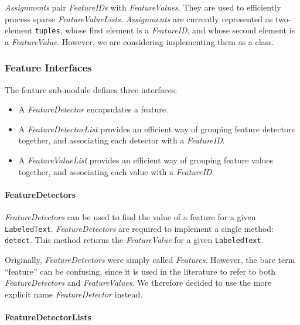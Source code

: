 \documentclass[12pt]{article}
\begin{document}
      \textit{Assignments} pair \textit{FeatureIDs} with
      \textit{FeatureValues}.  They are used to efficiently process
      sparse \textit{FeatureValueLists}.  \textit{Assignments} are
      currently represented as two-element \texttt{tuples}, whose
      first element is a \textit{FeatureID}, and whose second element
      is a \textit{FeatureValue}.  However, we are considering
      implementing them as a class.

    \subsubsection{Feature Interfaces}

      The feature sub-module defines three interfaces:

      \begin{itemize}
        \item A \textit{FeatureDetector} encapsulates a feature.

        \item A \textit{FeatureDetectorList} provides an efficient way
        of grouping feature detectors together, and associating each
        detector with a \textit{FeatureID}.

        \item A \textit{FeatureValueList} provides an efficient way of
        grouping feature values together, and associating each value
        with a \textit{FeatureID}.
      \end{itemize}

      \paragraph{FeatureDetectors}

      \textit{FeatureDetectors} can be used to find the value of a
      feature for a given \texttt{LabeledText}.
      \textit{FeatureDetectors} are required to implement a single
      method: \texttt{detect}.  This method returns the
      \textit{FeatureValue} for a given \texttt{LabeledText}.

      Originally, \textit{FeatureDetectors} were simply called
      \textit{Features}.  However, the bare term ``feature'' can be
      confusing, since it is used in the literature to refer to both
      \textit{FeatureDetectors} and \textit{FeatureValues}.  We
      therefore decided to use the more explicit name
      \textit{FeatureDetector} instead.

      \paragraph{FeatureDetectorLists}
\end{document}
